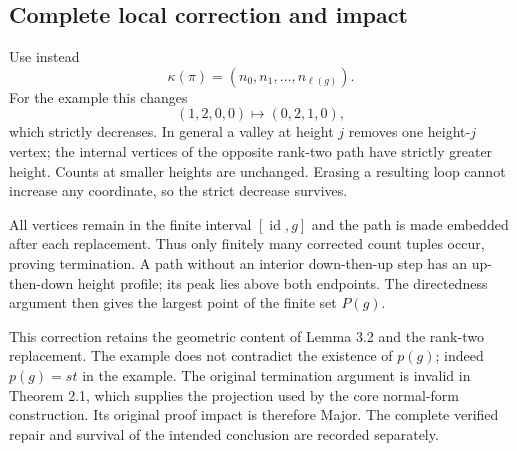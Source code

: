 \documentclass[10pt]{article}
\begin{document}
\subsection*{Complete local correction and impact}
Use instead \[\kappa(\pi)=(n_0,n_1,\ldots,n_{\ell(g)}).\] For the example this changes \[(1,2,0,0)\longmapsto(0,2,1,0),\] which strictly decreases. In general a valley at height \(j\) removes one height-\(j\) vertex; the internal vertices of the opposite rank-two path have strictly greater height. Counts at smaller heights are unchanged. Erasing a resulting loop cannot increase any coordinate, so the strict decrease survives.\par
All vertices remain in the finite interval \([\operatorname{id},g]\) and the path is made embedded after each replacement. Thus only finitely many corrected count tuples occur, proving termination. A path without an interior down-then-up step has an up-then-down height profile; its peak lies above both endpoints. The directedness argument then gives the largest point of the finite set \(P(g)\).\par
This correction retains the geometric content of Lemma 3.2 and the rank-two replacement. The example does not contradict the existence of \(p(g)\); indeed \(p(g)=st\) in the example. The original termination argument is invalid in Theorem 2.1, which supplies the projection used by the core normal-form construction. Its original proof impact is therefore Major. The complete verified repair and survival of the intended conclusion are recorded separately.\par
\end{document}
